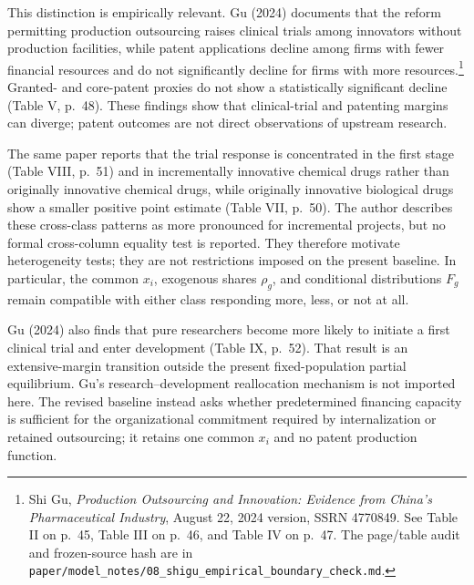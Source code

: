 \documentclass[11pt]{article}
\begin{document}
This distinction is empirically relevant. Gu (2024) documents that the
reform permitting production outsourcing raises clinical trials among
innovators without production facilities, while patent applications decline
among firms with fewer financial resources and do not significantly decline
for firms with more resources.\footnote{Shi Gu,
\textit{Production Outsourcing and Innovation: Evidence from China's
Pharmaceutical Industry}, August 22, 2024 version, SSRN 4770849. See
Table II on p.~45, Table III on p.~46, and Table IV on p.~47. The
page/table audit and frozen-source hash are in
\texttt{paper/model\_notes/08\_shigu\_empirical\_boundary\_check.md}.}
Granted- and core-patent proxies do not show a statistically significant
decline (Table V, p.~48). These findings show that clinical-trial and patenting
margins can diverge; patent outcomes are not direct observations of upstream
research.

The same paper reports that the trial response is concentrated in the first
stage (Table VIII, p.~51) and in incrementally innovative chemical drugs
rather than originally innovative chemical drugs, while originally
innovative biological drugs show a smaller positive point estimate
(Table VII, p.~50). The author describes these cross-class patterns as more
pronounced for incremental projects, but no formal cross-column equality test
is reported. They therefore motivate heterogeneity tests; they are not
restrictions imposed on the present baseline. In particular, the common
\(x_i\), exogenous shares \(\rho_g\), and conditional distributions \(F_g\)
remain compatible with either class responding more, less, or not at all.

Gu (2024) also finds that pure researchers become more likely to initiate a
first clinical trial and enter development (Table IX, p.~52). That result is
an extensive-margin transition outside the present fixed-population partial
equilibrium. Gu's research--development reallocation mechanism is not imported
here. The revised baseline instead asks whether predetermined financing
capacity is sufficient for the organizational commitment required by
internalization or retained outsourcing; it retains one common \(x_i\) and no
patent production function.


\end{document}
